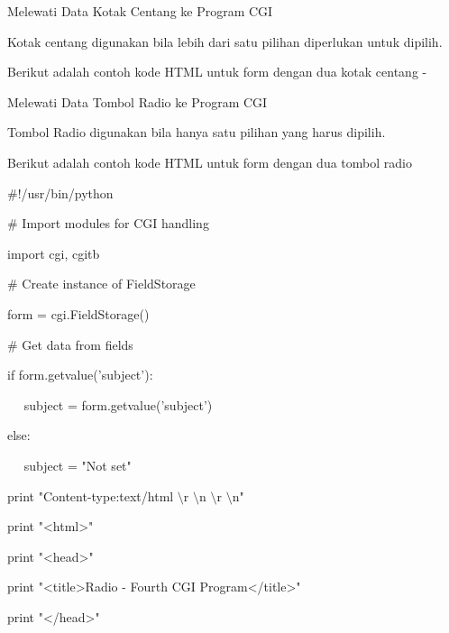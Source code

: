 \begin {enumerate}
Melewati Data Kotak Centang ke Program CGI \par
\vspace{12pt}
\noindent 
Kotak centang digunakan bila lebih dari satu pilihan diperlukan untuk dipilih. \par
\vspace{12pt}
\noindent 
Berikut adalah contoh kode HTML untuk form dengan dua kotak centang - \par
\vspace{12pt}
\noindent 
Melewati Data Tombol Radio ke Program CGI \par
\vspace{12pt}
\noindent 
Tombol Radio digunakan bila hanya satu pilihan yang harus dipilih. \par
\vspace{12pt}
\noindent 
Berikut adalah contoh kode HTML untuk form dengan dua tombol radio  \par
\vspace{12pt}
\vspace{12pt}
\noindent 
 $  \#  $!/usr/bin/python \par
\vspace{12pt}
\noindent 
 $  \#  $ Import modules for CGI handling  \par
\noindent 
import cgi, cgitb  \par
\vspace{12pt}
\noindent 
 $  \#  $ Create instance of FieldStorage  \par
\noindent 
form = cgi.FieldStorage()  \par
\vspace{12pt}
\noindent 
 $  \#  $ Get data from fields \par
\noindent 
if form.getvalue('subject'): \par
\noindent 
~~ subject = form.getvalue('subject') \par
\noindent 
else: \par
\noindent 
~~ subject = "Not set" \par
\vspace{12pt}
\noindent 
print "Content-type:text/html $  \setminus  $r $  \setminus  $n $  \setminus  $r $  \setminus  $n" \par
\noindent 
print "<html>" \par
\noindent 
print "<head>" \par
\noindent 
print "<title>Radio - Fourth CGI Program</title>" \par
\noindent 
print "</head>" \par

\end{enumerate}
